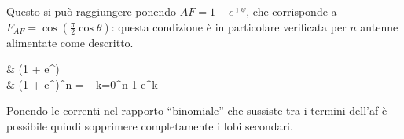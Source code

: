 		Questo si può raggiungere ponendo $AF = 1 + e^{\jmath \psi}$, che corrisponde a $F_{AF} = \cos\left( \frac{\pi}{2} \cos \theta \right)$: questa condizione è in particolare verificata per $n$ antenne alimentate come descritto.

		\begin{esp}
			& (1 + e^{\jmath \psi})  \\
			& \implies (1 + e^{\jmath \psi})^n =
				\sum_{k=0}^{n-1}  e^{\jmath k \psi} 
		\end{esp}

		Ponendo le correnti nel rapporto ``binomiale'' che sussiste tra i termini dell'\gls{af} è possibile quindi sopprimere completamente i lobi secondari.
